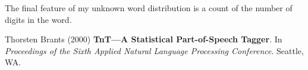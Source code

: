 \documentclass[11pt]{article}
\begin{document}
The final feature of my unknown word distribution is a count of the number of
digits in the word.

\begin{thebibliography}{}\raggedright

 Thorsten Brants (2000)
\textbf{TnT---A Statistical Part-of-Speech Tagger}.
In \emph{Proceedings of the Sixth Applied Natural Language Processing
Conference}. Seattle, WA.

\end{thebibliography}
\end{document}
